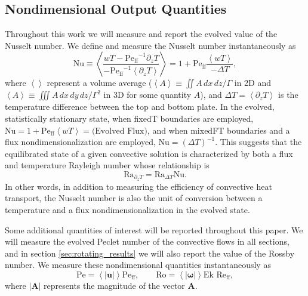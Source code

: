 \documentclass[aps, pre, onecolumn, nofootinbib, notitlepage, groupedaddress, amsfonts, amssymb, amsmath, longbibliography]{revtex4-1}
\newcommand{\angles}[1]{\ensuremath{\left\langle #1 \right\rangle}}
\newcommand{\Reff}{\ensuremath{\text{Re}_{\text{ff}}}}
\newcommand{\Peff}{\ensuremath{\text{Pe}_{\text{ff}}}}
\begin{document}
\subsection{Nondimensional Output Quantities}
\label{sec:ra_nu_relations}
Throughout this work we will measure and report the evolved value of the Nusselt number.
We define and measure the Nusselt number instantaneously as
\begin{equation}
\text{Nu} \equiv \angles{\frac{w T - \Peff^{-1} \partial_z T}{-\Peff^{-1} \angles{\partial_z T}}}
= 1 + \Peff\frac{\angles{w T}}{-\Delta T},
\end{equation}
where $\angles{}$ represent a volume average ($\angles{A} \equiv \iint A\,dx\,dz / \Gamma$ in 2D and $\angles{A} \equiv \iiint A\,dx\,dy\,dz / \Gamma^2$ in 3D for some quantity $A$), and $\Delta T = \angles{\partial_z T}$ is the temperature difference between the top and bottom plate.
In the evolved, statistically stationary state, when fixedT boundaries are employed, $\text{Nu} = 1 + \Peff\angles{wT} = \text{(Evolved Flux)}$, and when mixedFT boundaries and a flux nondimensionalization are employed, $\text{Nu} = (\Delta T)^{-1}$.
This suggests that the equilibrated state of a given convective solution is characterized by both a flux and temperature Rayleigh number whose relationship is
\begin{equation}
\text{Ra}_{\partial_z T} = \text{Ra}_{\Delta T} \text{Nu}.
\label{eqn:ra_relation}
\end{equation}
In other words, in addition to measuring the efficiency of convective heat transport, the Nusselt number is also the unit of conversion between a temperature and a flux nondimensionalization in the evolved state.

Some additional quantities of interest will be reported throughout this paper.
We will measure the evolved Peclet number of the convective flows in all sections, and in section \ref{sec:rotating_results} we will also report the value of the Rossby number.
We measure these nondimensional quantities instantaneously as
\begin{equation}
\text{Pe} = \angles{|\bm{u}|}\Peff,\qquad \text{Ro} = \angles{|\bm{\omega}|}\text{Ek }\Reff,
\end{equation}
where $|\bm{A}|$ represents the magnitude of the vector $\bm{A}$.
\end{document}
